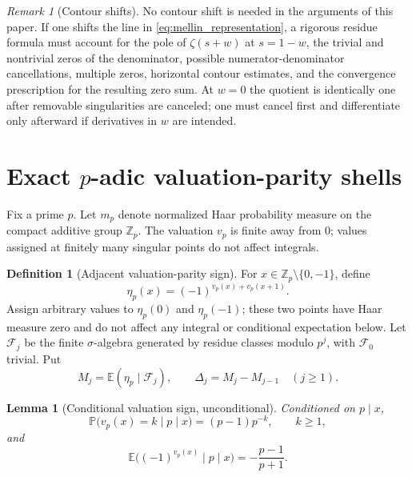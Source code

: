 \documentclass[11pt]{amsart}
\numberwithin{equation}{section}
\theoremstyle{plain}
\newtheorem{lemma}[theorem]{Lemma}
\theoremstyle{definition}
\newtheorem{definition}[theorem]{Definition}
\theoremstyle{remark}
\newtheorem{remark}[theorem]{Remark}
\newcommand{\Z}{\mathbb Z}
\newcommand{\E}{\mathbb E}
\newcommand{\Prob}{\mathbb P}
\begin{document}
\begin{remark}[Contour shifts]
\label{rem:contour_shifts}
No contour shift is needed in the arguments of this paper.  If one shifts the line in \eqref{eq:mellin_representation}, a rigorous residue formula must account for the pole of $\zeta(s+w)$ at $s=1-w$, the trivial and nontrivial zeros of the denominator, possible numerator-denominator cancellations, multiple zeros, horizontal contour estimates, and the convergence prescription for the resulting zero sum.  At $w=0$ the quotient is identically one after removable singularities are canceled; one must cancel first and differentiate only afterward if derivatives in $w$ are intended.
\end{remark}

\section{Exact \texorpdfstring{$p$}{p}-adic valuation-parity shells}
\label{sec:padic_shells}

Fix a prime $p$.  Let $m_p$ denote normalized Haar probability measure on the compact additive group $\Z_p$.  The valuation $v_p$ is finite away from $0$; values assigned at finitely many singular points do not affect integrals.

\begin{definition}[Adjacent valuation-parity sign]
\label{def:eta_p}
For $x\in\Z_p\setminus\{0,-1\}$, define
\begin{equation}
\eta_p(x)=(-1)^{v_p(x)+v_p(x+1)}.
\label{eq:eta_p}
\end{equation}
Assign arbitrary values to $\eta_p(0)$ and $\eta_p(-1)$; these two points have Haar measure zero and do not affect any integral or conditional expectation below.  Let $\mathcal F_j$ be the finite $\sigma$-algebra generated by residue classes modulo $p^j$, with $\mathcal F_0$ trivial.  Put
\begin{equation}
M_j=\E(\eta_p\mid\mathcal F_j),
\qquad
\Delta_j=M_j-M_{j-1}\quad(j\ge1).
\label{eq:padic_martingale}
\end{equation}
\end{definition}

\begin{lemma}[Conditional valuation sign, unconditional]
\label{lem:conditional_valuation}
Conditioned on $p\mid x$,
\begin{equation}
\Prob\bigl(v_p(x)=k\mid p\mid x\bigr)=(p-1)p^{-k},
\qquad k\ge1,
\label{eq:valuation_distribution}
\end{equation}
and
\begin{equation}
\E\bigl((-1)^{v_p(x)}\mid p\mid x\bigr)
=-\frac{p-1}{p+1}.
\label{eq:conditional_valuation_mean}
\end{equation}
\end{lemma}
\end{document}
